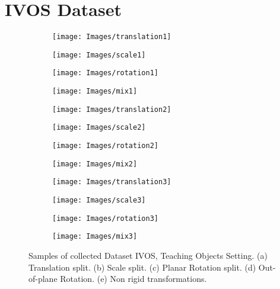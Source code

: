 \documentclass[letterpaper, 10 pt, conference]{ieeeconf}
\begin{document}
\section{IVOS Dataset}
\begin{figure*}[ht!]
\centering
\begin{subfigure}{.12\textwidth}
    \texttt{[image: Images/translation1]}
\end{subfigure}\begin{subfigure}{.12\textwidth}
    \texttt{[image: Images/scale1]}
\end{subfigure}\begin{subfigure}{.12\textwidth}
    \texttt{[image: Images/rotation1]}
\end{subfigure}
\begin{subfigure}{.12\textwidth}
    \texttt{[image: Images/mix1]}
\end{subfigure}

\begin{subfigure}{.12\textwidth}
    \texttt{[image: Images/translation2]}
\end{subfigure}\begin{subfigure}{.12\textwidth}
    \texttt{[image: Images/scale2]}
\end{subfigure}\begin{subfigure}{.12\textwidth}
    \texttt{[image: Images/rotation2]}
\end{subfigure}
\begin{subfigure}{.12\textwidth}
    \texttt{[image: Images/mix2]}
\end{subfigure}

\begin{subfigure}{.12\textwidth}
    \texttt{[image: Images/translation3]}
    \caption{}
\end{subfigure}\begin{subfigure}{.12\textwidth}
    \texttt{[image: Images/scale3]}
    \caption{}
\end{subfigure}\begin{subfigure}{.12\textwidth}
    \texttt{[image: Images/rotation3]}
    \caption{}
\end{subfigure}
\begin{subfigure}{.12\textwidth}
    \texttt{[image: Images/mix3]}
    \caption{}
\end{subfigure}
\caption{Samples of collected Dataset IVOS, Teaching Objects Setting. (a) Translation split. (b) Scale split. (c) Planar Rotation split. (d) Out-of-plane Rotation. (e) Non rigid transformations.}
\label{fig:ford_objects}
\end{figure*}
\end{document}
